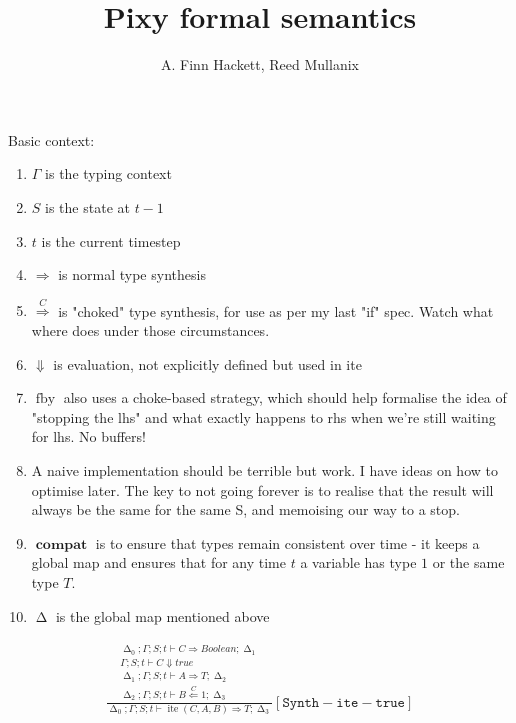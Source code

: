 \documentclass{scrartcl}
\DeclareMathOperator{\fby}{fby}
\DeclareMathOperator{\ite}{ite}
\DeclareMathOperator{\compat}{\mathbf{compat}}
\DeclareMathOperator{\gtypes}{\Delta}
\begin{document}
    \title{Pixy formal semantics}
    \author{A. Finn Hackett, Reed Mullanix}
    \maketitle
    
    Basic context:
    \begin{enumerate}
        \item $\Gamma$ is the typing context
        \item $S$ is the state at $t-1$
        \item $t$ is the current timestep
        \item $\Rightarrow$ is normal type synthesis
        \item $\overset{C}{\Rightarrow}$ is "choked" type synthesis, for use as per my last "if" spec. Watch what where does under those circumstances.
        \item $\Downarrow$ is evaluation, not explicitly defined but used in ite
        \item $\fby$ also uses a choke-based strategy, which should help formalise the idea of "stopping the lhs" and what exactly happens to rhs when we're still
        waiting for lhs. No buffers!
        \item A naive implementation should be terrible but work. I have ideas on how to optimise later. The key to not going forever is to realise that the result will always be the same for the same S, and memoising our way to a stop.
        \item $\compat$ is to ensure that types remain consistent over time - it keeps a global map and ensures that for any time $t$ a variable has type $1$ or the same type $T$.
        \item $\gtypes$ is the global map mentioned above
    \end{enumerate}
    
    \begin{align*}
    \frac{
        \begin{matrix}
        \gtypes_0; \Gamma; S; t \vdash C \Rightarrow Boolean; \gtypes_1 \\
        \Gamma; S; t \vdash C \Downarrow true \\
        \gtypes_1; \Gamma; S; t \vdash A \Rightarrow T; \gtypes_2 \\
        \gtypes_2; \Gamma; S; t \vdash B \overset{C}{\Leftarrow} 1; \gtypes_3
        \end{matrix}
    }{
        \gtypes_0; \Gamma; S; t \vdash \ite(C,A,B) \Rightarrow T; \gtypes_3
    }[\mathtt{Synth-ite-true}]
    \end{align*}
    
\end{document}
